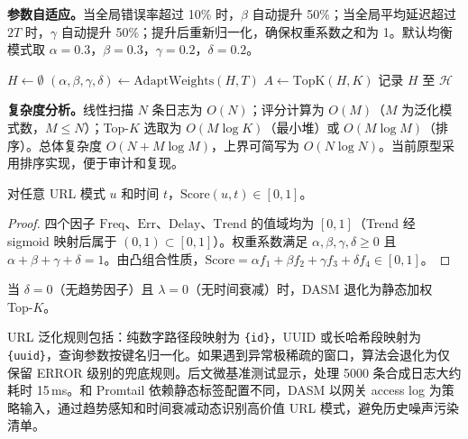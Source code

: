 \textbf{参数自适应。}当全局错误率超过 10\% 时，$\beta$ 自动提升 50\%；当全局平均延迟超过 $2T$ 时，$\gamma$ 自动提升 50\%；提升后重新归一化，确保权重系数之和为 1。默认均衡模式取 $\alpha{=}0.3$，$\beta{=}0.3$，$\gamma{=}0.2$，$\delta{=}0.2$。

\begin{algorithm}[H]
\caption{基于 DASM 的关注清单动态生成}\label{alg:attention}
$H \leftarrow \emptyset$\;
$(\alpha,\beta,\gamma,\delta) \leftarrow \mathrm{AdaptWeights}(H, T)$ 
$A \leftarrow \mathrm{TopK}(H, K)$ 
记录 $H$ 至 $\mathcal{H}$ 
\;
\end{algorithm}

\textbf{复杂度分析。}线性扫描 $N$ 条日志为 $O(N)$；评分计算为 $O(M)$（$M$ 为泛化模式数，$M\leq N$）；Top-$K$ 选取为 $O(M\log K)$（最小堆）或 $O(M\log M)$（排序）。总体复杂度 $O(N+M\log M)$，上界可简写为 $O(N\log N)$。当前原型采用排序实现，便于审计和复现。

\begin{theorem}\label{thm:bound}
对任意 URL 模式 $u$ 和时间 $t$，$\mathrm{Score}(u,t)\in[0,1]$。
\end{theorem}
\begin{proof}
四个因子 $\mathrm{Freq}$、$\mathrm{Err}$、$\mathrm{Delay}$、$\mathrm{Trend}$ 的值域均为 $[0,1]$（Trend 经 sigmoid 映射后属于 $(0,1)\subset[0,1]$）。权重系数满足 $\alpha,\beta,\gamma,\delta\geq 0$ 且 $\alpha+\beta+\gamma+\delta=1$。由凸组合性质，$\mathrm{Score}=\alpha f_1+\beta f_2+\gamma f_3+\delta f_4\in[0,1]$。
\end{proof}

\begin{proposition}\label{prop:degrade}
当 $\delta=0$（无趋势因子）且 $\lambda=0$（无时间衰减）时，DASM 退化为静态加权 Top-$K$。
\end{proposition}

URL 泛化规则包括：纯数字路径段映射为 \texttt{\{id\}}，UUID 或长哈希段映射为 \texttt{\{uuid\}}，查询参数按键名归一化。如果遇到异常极稀疏的窗口，算法会退化为仅保留 ERROR 级别的兜底规则。后文微基准测试显示，处理 5000 条合成日志大约耗时 15\,ms。和 Promtail 依赖静态标签配置不同，DASM 以网关 access log 为策略输入，通过趋势感知和时间衰减动态识别高价值 URL 模式，避免历史噪声污染清单。

